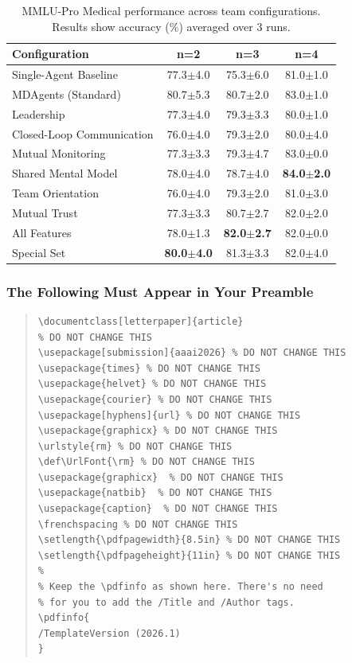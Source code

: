 \documentclass[letterpaper]{article} %
\def\UrlFont{\rm}  %
\begin{document}
\begin{table}[htbp]
\centering
\caption{MMLU-Pro Medical performance across team configurations. Results show accuracy (\%) averaged over 3 runs.}
\label{tab:mmlu_results}
\scriptsize
\begin{tabular}{l|ccc}
\hline
\textbf{Configuration} & \textbf{n=2} & \textbf{n=3} & \textbf{n=4} \\
\hline
Single-Agent Baseline & 77.3$\pm$4.0 & 75.3$\pm$6.0 & 81.0$\pm$1.0 \\
MDAgents (Standard) & 80.7$\pm$5.3 & 80.7$\pm$2.0 & 83.0$\pm$1.0 \\
Leadership & 77.3$\pm$4.0 & 79.3$\pm$3.3 & 80.0$\pm$1.0 \\
Closed-Loop Communication & 76.0$\pm$4.0 & 79.3$\pm$2.0 & 80.0$\pm$4.0 \\
Mutual Monitoring & 77.3$\pm$3.3 & 79.3$\pm$4.7 & 83.0$\pm$0.0 \\
Shared Mental Model & 78.0$\pm$4.0 & 78.7$\pm$4.0 & \textbf{84.0$\pm$2.0} \\
Team Orientation & 76.0$\pm$4.0 & 79.3$\pm$2.0 & 81.0$\pm$3.0 \\
Mutual Trust & 77.3$\pm$3.3 & 80.7$\pm$2.7 & 82.0$\pm$2.0 \\
All Features & 78.0$\pm$1.3 & \textbf{82.0$\pm$2.7} & 82.0$\pm$0.0 \\
Special Set & \textbf{80.0$\pm$4.0} & 81.3$\pm$3.3 & 82.0$\pm$4.0 \\
\hline
\end{tabular}
\end{table}

\subsubsection{The Following Must Appear in Your Preamble}
\begin{quote}
\begin{scriptsize}\begin{verbatim}
\documentclass[letterpaper]{article}
% DO NOT CHANGE THIS
\usepackage[submission]{aaai2026} % DO NOT CHANGE THIS
\usepackage{times} % DO NOT CHANGE THIS
\usepackage{helvet} % DO NOT CHANGE THIS
\usepackage{courier} % DO NOT CHANGE THIS
\usepackage[hyphens]{url} % DO NOT CHANGE THIS
\usepackage{graphicx} % DO NOT CHANGE THIS
\urlstyle{rm} % DO NOT CHANGE THIS
\def\UrlFont{\rm} % DO NOT CHANGE THIS
\usepackage{graphicx}  % DO NOT CHANGE THIS
\usepackage{natbib}  % DO NOT CHANGE THIS
\usepackage{caption}  % DO NOT CHANGE THIS
\frenchspacing % DO NOT CHANGE THIS
\setlength{\pdfpagewidth}{8.5in} % DO NOT CHANGE THIS
\setlength{\pdfpageheight}{11in} % DO NOT CHANGE THIS
%
% Keep the \pdfinfo as shown here. There's no need
% for you to add the /Title and /Author tags.
\pdfinfo{
/TemplateVersion (2026.1)
}
\end{verbatim}\end{scriptsize}
\end{quote}
\end{document}

